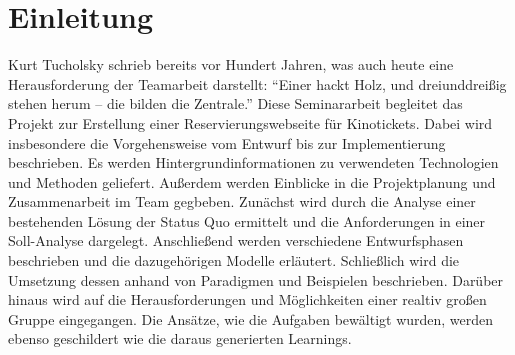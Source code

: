 \chapter{Einleitung}

Kurt Tucholsky schrieb bereits vor Hundert Jahren, was auch heute eine Herausforderung der Teamarbeit darstellt: \enquote{Einer hackt Holz, und dreiunddreißig stehen herum – die bilden die Zentrale.} \newline
Diese Seminararbeit begleitet das Projekt zur Erstellung einer Reservierungswebseite für Kinotickets. Dabei wird insbesondere die Vorgehensweise vom Entwurf bis zur Implementierung beschrieben. Es werden Hintergrundinformationen zu verwendeten Technologien und Methoden geliefert. Außerdem werden Einblicke in die Projektplanung und Zusammenarbeit im Team gegbeben. 
Zunächst wird durch die Analyse einer bestehenden Lösung der Status Quo ermittelt und die Anforderungen in einer Soll-Analyse dargelegt. Anschließend werden verschiedene Entwurfsphasen beschrieben und die dazugehörigen Modelle erläutert. Schließlich wird die Umsetzung dessen anhand von Paradigmen und Beispielen beschrieben.
Darüber hinaus wird auf die Herausforderungen und Möglichkeiten einer realtiv großen Gruppe eingegangen. Die Ansätze, wie die Aufgaben bewältigt wurden, werden ebenso geschildert wie die daraus generierten Learnings. 


